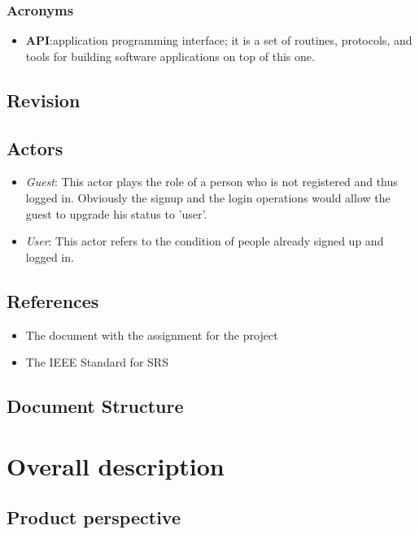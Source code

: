 \documentclass{article}
\begin{document}
\subsubsection{Acronyms}
\begin{itemize}
	\item \textbf{API}:\@ application programming interface; it is a set of routines, protocols, and tools for building software applications on top of this one.
\end{itemize}
\subsection{Revision}



\subsection{Actors}
\begin{itemize}
	\item \textit{Guest}: This actor plays the role of a person who is not registered and thus logged in. Obviously the signup and the login operations would allow the guest to upgrade his status to 'user'.
	\item \textit{User}: This actor refers to the condition of people already signed up and logged in. 

\end{itemize}

\subsection{References}
\begin{itemize}
	\item The document with the assignment for the project
	\item The IEEE Standard for SRS 
\end{itemize}
\subsection{Document Structure}


\clearpage
\section{Overall description}

\subsection{Product perspective}

\end{document}
